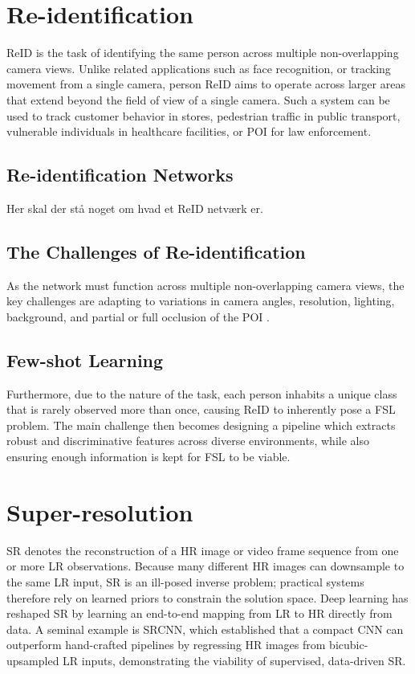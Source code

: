\section{Re-identification}

\ac{ReID} is the task of identifying the same person across multiple non-overlapping camera views. Unlike related applications such as face recognition, or tracking movement from a single camera, person \acs{ReID} aims to operate across larger areas that extend beyond the field of view of a single camera. Such a system can be used to track customer behavior in stores, pedestrian traffic in public transport, vulnerable individuals in healthcare facilities, or \ac{POI} for law enforcement. 

\subsection{Re-identification Networks}
Her skal der stå noget om hvad et ReID netværk er. 

\subsection{The Challenges of Re-identification}
As the network must function across multiple non-overlapping camera views, the key challenges are adapting to variations in camera angles, resolution, lighting, background, and partial or full occlusion of the \acs{POI} \cite{IntroPReID2023}.

\subsection{Few-shot Learning}
Furthermore, due to the nature of the task, each person inhabits a unique class that is rarely observed more than once, causing \ac{ReID} to inherently pose a \ac{FSL} problem. The main challenge then becomes designing a pipeline which extracts robust and discriminative features across diverse environments, while also ensuring enough information is kept for \acs{FSL} to be viable.

\section{Super-resolution}

\ac{SR} denotes the reconstruction of a \ac{HR} image or video frame sequence from one or more \ac{LR} observations. Because many different \acs{HR} images can downsample to the same \acs{LR} input, \acs{SR} is an ill-posed inverse problem; practical systems therefore rely on learned priors to constrain the solution space. Deep learning has reshaped \acs{SR} by learning an end-to-end mapping from \acs{LR} to \acs{HR} directly from data. A seminal example is SRCNN, which established that a compact \ac{CNN} can outperform hand-crafted pipelines by regressing \acs{HR} images from bicubic-upsampled \acs{LR} inputs, demonstrating the viability of supervised, data-driven \acs{SR}.\cite{dong2015imagesuperresolutionusingdeep}


